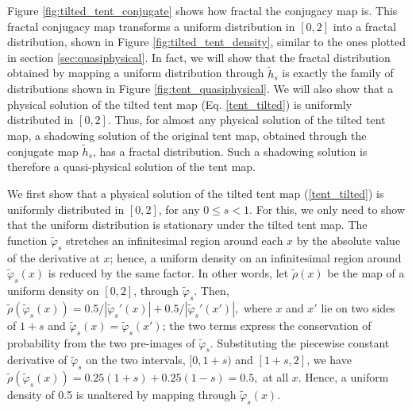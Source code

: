 \documentclass[preprint,12pt]{elsarticle}
\begin{document}
Figure \ref{fig:tilted_tent_conjugate} shows how fractal the conjugacy map is.
This fractal conjugacy map transforms a uniform distribution in $[0,2]$ into
a fractal distribution, shown in Figure \ref{fig:tilted_tent_density},
similar to the ones plotted in section \ref{sec:quasiphysical}.
In fact, we will show that the fractal distribution obtained by mapping a uniform
distribution through $\tilde{h}_s$ is exactly the family of distributions
shown in Figure \ref{fig:tent_quasiphysical}.  We will also show that
a physical solution of the tilted tent map (Eq. \ref{tent_tilted}) is uniformly
distributed in $[0,2]$.  Thus, for almost any physical solution of the
tilted tent map, a shadowing solution of the original tent map, obtained
through the conjugate map $\tilde{h}_s$, has a fractal distribution.
Such a shadowing solution is therefore a quasi-physical solution of
the tent map.

We first show that a physical solution of the tilted tent map 
(\ref{tent_tilted}) is uniformly distributed in $[0,2]$, for
any $0\le s<1$. For this, we only need to show that the uniform
distribution is stationary under the tilted tent map.
The function $\tilde{\varphi}_s$ stretches an infinitesimal
region around each $x$ by the absolute value of the derivative at $x$; 
hence, a uniform density on an infinitesimal region around $\tilde{\varphi}_s(x)$ 
is reduced by the same factor. In other words, let $\tilde{\rho}(x)$ 
be the map of a uniform density on $[0,2]$, through $\tilde{\varphi}_s$. Then, 
$\tilde{\rho}(\tilde{\varphi}_s (x)) = 0.5/|\tilde \varphi_s'(x)| + 0.5/|\tilde \varphi_s'(x')|,$ where
$x$ and $x'$ lie on two sides of $1+s$ and
$\tilde{\varphi}_s(x)=\tilde{\varphi}_s(x')$; the two terms express the conservation of probability 
from the two pre-images of $\tilde{\varphi}_s$. Substituting the piecewise constant 
derivative of $\tilde{\varphi}_s$ on the two intervals, $[0,1+s)$ and $[1+s,2]$,
we have $\tilde{\rho}(\tilde{\varphi}_s (x)) = 0.25(1+s) + 0.25(1-s) = 0.5,$ at 
all $x.$ Hence, a uniform density of 0.5 is unaltered by mapping through 
$\tilde\varphi_s(x)$.
\end{document}
